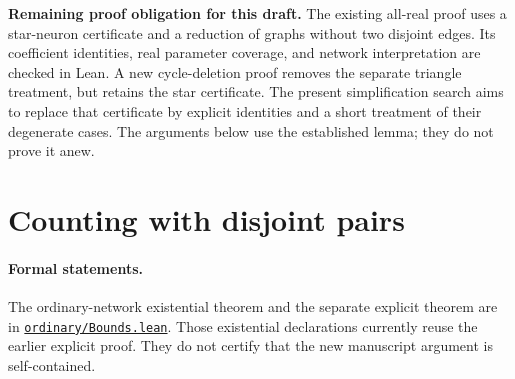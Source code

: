 \documentclass[11pt]{article}
\begin{document}
\noindent\textbf{Remaining proof obligation for this draft.}
The existing all-real proof uses a star-neuron certificate and a reduction
of graphs without two disjoint edges. Its coefficient identities, real
parameter coverage, and network interpretation are checked in Lean.
A new cycle-deletion proof removes the separate triangle treatment, but
retains the star certificate. The present simplification search aims to
replace that certificate by explicit identities and a short treatment of
their degenerate cases. The arguments below use the established lemma;
they do not prove it anew.

\section{Counting with disjoint pairs}


\paragraph{Formal statements.}
The ordinary-network existential theorem and the separate explicit theorem
are in
\href{https://github.com/JayPiZimmermann/Max_Caterpillar/blob/82ef24b251327b2e1bfdf92a39c6f6b9e7c6924f/research/sN/clean_quadratic_20261103/ordinary/Bounds.lean}{\texttt{ordinary/Bounds.lean}}.
Those existential declarations currently reuse the earlier explicit proof.
They do not certify that the new manuscript argument is self-contained.
\end{document}
